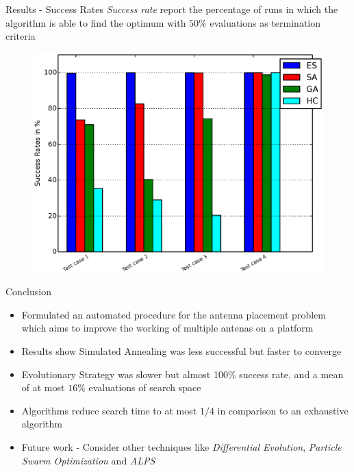\documentclass{beamer}
\begin{document}
\begin{frame}{Results - Success Rates}
    \textit{Success rate} report the percentage of runs in which the algorithm is able to find the optimum with $50\%$ evaluations as termination criteria
    \begin{figure}
        \vspace*{-0.35cm}
        \centering
        \includegraphics[scale=0.4]{../paper/FIG/tc_sp}
    \end{figure}
\end{frame}

\begin{frame}{Conclusion}
\begin{itemize} \itemsep1.2em
        \item Formulated an automated procedure for the antenna placement problem which aims to improve the working of multiple antenas on a platform
        \item Results show Simulated Annealing was less successful but faster to converge 
        \item Evolutionary Strategy was slower but almost 100\% success rate, and a mean of at most $16\%$ evaluations of search space 
        \item Algorithms reduce search time to at most $1/4$ in comparison to an exhaustive algorithm
        \item Future work - Consider other techniques like \textit{Differential Evolution}, \textit{Particle Swarm Optimization} and \textit{ALPS}
    \end{itemize}
\end{frame}
\end{document}

